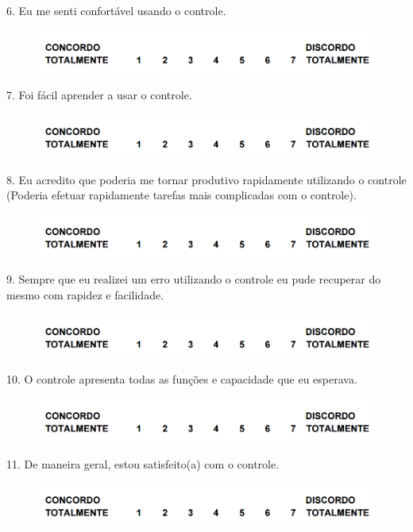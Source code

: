 \begin{flushleft}
6. Eu me senti confortável usando o controle.
\begin{figure}[H]	
	\centering
	\includegraphics[scale=0.6]{Imagens/questionarios.png}
	\label{f.questionarios}
\end{figure}


7. Foi fácil aprender a usar o controle.
\begin{figure}[H]	
	\centering
	\includegraphics[scale=0.6]{Imagens/questionarios.png}
	\label{f.questionarios}
\end{figure}

8. Eu acredito que poderia me tornar produtivo rapidamente utilizando o controle (Poderia efetuar rapidamente tarefas mais complicadas com o controle).
\begin{figure}[H]	
	\centering
	\includegraphics[scale=0.6]{Imagens/questionarios.png}
	\label{f.questionarios}
\end{figure}

9. Sempre que eu realizei um erro utilizando o controle eu pude recuperar do mesmo com rapidez e facilidade.
\begin{figure}[H]	
	\centering
	\includegraphics[scale=0.6]{Imagens/questionarios.png}
	\label{f.questionarios}
\end{figure}

10. O controle apresenta todas as funções e capacidade que eu esperava.
\begin{figure}[H]	
	\centering
	\includegraphics[scale=0.6]{Imagens/questionarios.png}
	\label{f.questionarios}
\end{figure}

11. De maneira geral, estou satisfeito(a) com o controle.
\begin{figure}[H]	
	\centering
	\includegraphics[scale=0.6]{Imagens/questionarios.png}
	\label{f.questionarios}
\end{figure}
\end{flushleft}